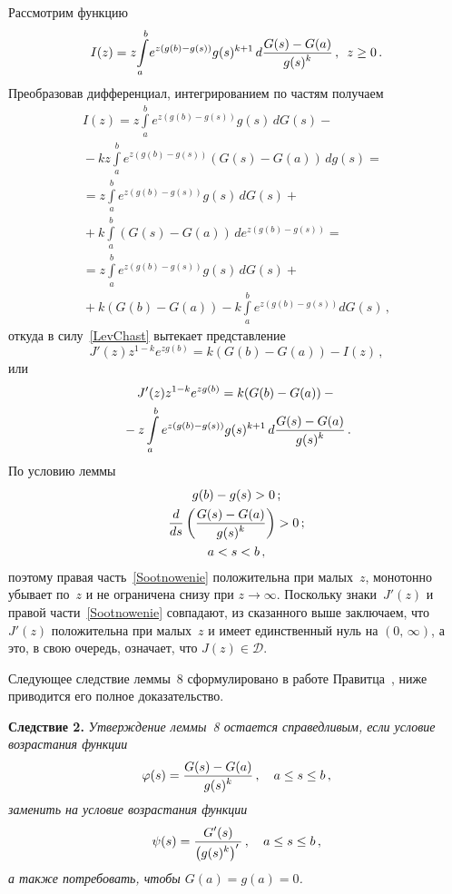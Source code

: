 \begin{multicols}{2}
Рассмотрим функцию
\begin{equation*}
I(z)= z\!\int\limits_a^b \!{e^{z(g(b)-g(s))}g(s)^{k+1}\,
d\displaystyle\frac{\displaystyle G(s)-G(a)\mathstrut}{\displaystyle g(s)^k\mathstrut}}\,,\enskip z\ge0\,.
\end{equation*}
Преобразовав дифференциал, интегрированием по частям получаем
\begin{multline*}
I(z)=z\int\limits_a^b{e^{z(g(b)-g(s))}g(s)\,dG(s)}-{}\\
{}-
kz\int\limits_a^b e^{z(g(b)-g(s))}(G(s)-G(a))\,dg(s)={}\\
{}=z\int\limits_a^b{e^{z(g(b)-g(s))}g(s)\,dG(s)}+{}\\
{}+
k\int\limits_a^b{(G(s)-G(a))\,de^{z(g(b)-g(s))}}={}\\
{}=z\int\limits_a^b{e^{z(g(b)-g(s))}g(s)\,dG(s)}+{}\\
{}+
k(G(b)-G(a))-k\int\limits_a^b{e^{z(g(b)-g(s))}dG(s)}\,,
\end{multline*}
откуда в силу~\eqref{LevChast} вытекает представление
$$
J'(z)z^{1-k}e^{zg(b)}= k(G(b)-G(a))-I(z)\,,
$$
или
\begin{multline}
J'(z)z^{1-k}e^{zg(b)} =k(G(b)-G(a))-{}\\
{}-
z\int\limits_a^b{e^{z(g(b)-g(s))}g(s)^{k+1}\,
d\displaystyle\frac{\displaystyle G(s)-G(a)\mathstrut}{\displaystyle g(s)^k\mathstrut}}\,.
\label{Sootnowenie}
\end{multline}
По условию леммы
\begin{gather*}
g(b)-g(s)>0\,;\\
\displaystyle\frac{\displaystyle d\mathstrut}{\displaystyle ds\mathstrut}\left(\displaystyle\frac{\displaystyle G(s)-G(a)\mathstrut}{\displaystyle g(s)^k\mathstrut}\right)>0\,;\\ 
a< s< b\,,
\end{gather*}
поэтому правая часть~\eqref{Sootnowenie} положительна при малых~$z$,
монотонно убывает по~$z$ и не ограничена снизу при $z\to\infty$.
Поскольку знаки~$J'(z)$ и правой части~\eqref{Sootnowenie}
совпадают, из сказанного выше заключаем, что~$J'(z)$ положительна
при малых~$z$ и имеет единственный нуль на $(0,\,\infty)$, а это, в
свою очередь, означает, что $J(z)\in \mathcal D.$

\smallskip

Следующее следствие леммы~8 сформулировано в работе
Правитца~\cite{Prawitz1975}, ниже приводится его полное
доказательство.


\smallskip

\noindent
\textbf{Следствие 2.} %
\textit{Утверждение леммы~8 остается справедливым, если
условие возрастания функции
$$
\varphi(s)=\displaystyle\frac{\displaystyle G(s)-G(a)\mathstrut}{\displaystyle g(s)^k\mathstrut}\,,\quad a\le s\le b\,,
$$
заменить на условие возрастания функции
$$
\psi(s)=
\displaystyle\frac{\displaystyle G'(s)\mathstrut}{\displaystyle \left(g(s)^k\right)'\mathstrut}\,,\quad a\le
s\le b\,,
$$
а также потребовать, чтобы $G(a)=g(a)=0$.}


\end{multicols}
